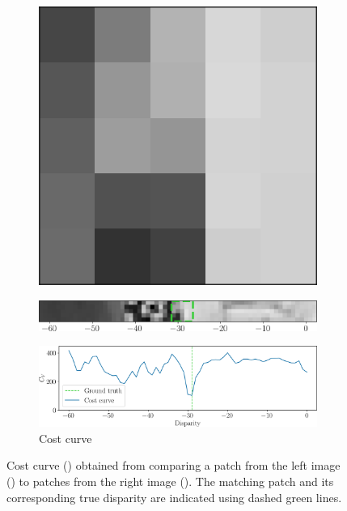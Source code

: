 \begin{figure}
    \centering
    \begin{subfigure}[t]{0.073\linewidth}
        \centering
        \includegraphics[width=\linewidth]{Images/Chap_5/tuto_left_patch.png}
        \caption{}
        \label{fig:tuto_a}
    \end{subfigure}
    \hfill\begin{subfigure}[t]{\linewidth}
        \flushright
        \includegraphics[width=0.927\linewidth]{Images/Chap_5/tuto_right_patch.png}
        \caption{}
        \label{fig:tuto_b}
    \end{subfigure}
    \begin{subfigure}[t]{\linewidth}
        \centering
        \includegraphics[width=\linewidth]{Images/Chap_5/tuto_cost_curve.png}
        \caption{Cost curve}
        \label{fig:tuto_c}
    \end{subfigure}
    \caption{Cost curve () obtained from comparing a patch from the left image () to patches from the right image (). The matching patch and its corresponding true disparity are indicated using dashed green lines.}
    \label{fig:tuto_dense_matching}
\end{figure}

